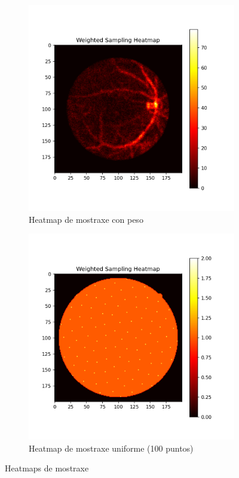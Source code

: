\begin{figure}[]
\begin{subfigure}[b]{0.3\textwidth}
        \includegraphics[width=\textwidth]{imaxes/weighted_sampling_heatmap.png}
        \caption{Heatmap de mostraxe con peso}
        \label{fig:weighted_sampling_heatmap}
    \end{subfigure}
    \hfill
    \begin{subfigure}[b]{0.3\textwidth}
        \centering
        \includegraphics[width=\textwidth]{imaxes/uniform_sampling_heatmap.png}
        \caption{Heatmap de mostraxe uniforme (100 puntos)}
        \label{fig:uniform_sampling_heatmap}
    \end{subfigure}
    \caption{Heatmaps de mostraxe}
    \label{fig:sampling_heatmaps}
\end{figure}


